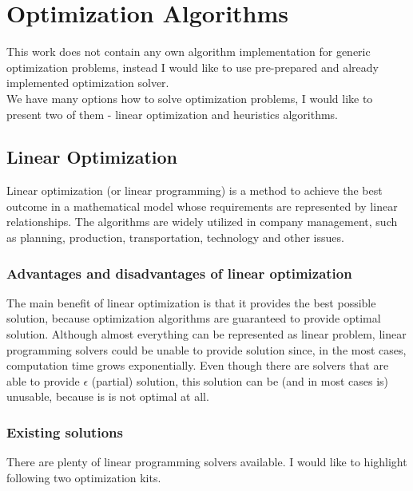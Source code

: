 
\section{Optimization Algorithms}\label{sec:optimization-algorithms}

This work does not contain any own algorithm implementation for generic optimization problems,
instead I would like to use pre-prepared and already implemented optimization solver.\\
We have many options how to solve optimization problems, I would like to present two of them
- linear optimization and heuristics algorithms.

\subsection{Linear Optimization}\label{subsec:linear-optimization}
Linear optimization (or linear programming) is a method to achieve the best outcome in a mathematical model
whose requirements are represented by linear relationships.\cite{web_wiki:linearProgramming}
The algorithms are widely utilized in company management, such as planning, production, transportation, technology and other issues.


\subsubsection{Advantages and disadvantages of linear optimization}
The main benefit of linear optimization is that it provides the best possible solution,
because optimization algorithms are guaranteed to provide optimal solution.
Although almost everything can be represented as linear problem,
linear programming solvers could be unable to provide solution since, in the most cases, computation time grows exponentially.
Even though there are solvers that are able to provide $\epsilon$ (partial) solution,
this solution can be (and in most cases is) unusable, because is is not optimal at all.

\subsubsection{Existing solutions}\label{subsec:existing-solutions-lin}
There are plenty of linear programming solvers available.
I would like to highlight following two optimization kits.\\

